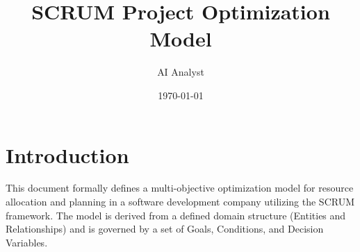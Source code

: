 \documentclass[11pt]{article}
\title{SCRUM Project Optimization Model}
\author{AI Analyst}
\date{\today}
\begin{document}
\maketitle

\renewcommand{\contentsname}{Table of Contents}
\tableofcontents
\newpage

\section*{Introduction}
This document formally defines a multi-objective optimization model for resource allocation and planning in a software development company utilizing the SCRUM framework. The model is derived from a defined domain structure (Entities and Relationships) and is governed by a set of Goals, Conditions, and Decision Variables.
\end{document}
